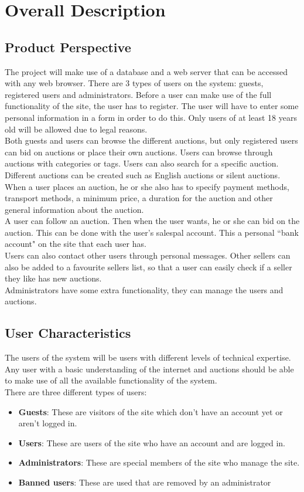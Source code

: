 \chapter{Overall Description}

\section{Product Perspective}
	The project will make use of a database and a web server that can be 
	accessed with any web browser. There are 3 types of users on the system:
	guests, registered users and administrators. Before a user can make use
	of the full functionality of the site, the user has to register. The user
	will have to enter some personal information in a form in order to do this.
	Only users of at least 18 years old will be allowed due to legal reasons.\\
	Both guests and users can browse the different auctions, but only registered 
	users can bid on auctions or place their own auctions. Users can browse through
	auctions with categories or tags. Users can also search for a  specific auction.\\
	Different auctions can be created such as English auctions\cite{English} or
	silent auctions\cite{silent}. When a user places an auction, he or she also has to specify
	payment methods, transport methods, a minimum price, a duration for the auction
	and other general information about the auction.\\
	A user can follow an auction. Then when the user wants, he or she can bid on the auction.
	This can be done with the user's salespal account. This a personal ``bank account" on
	the site that each user has. \\
	Users can also contact other users through personal messages. Other sellers can also
	be added to a favourite sellers list, so that a user can easily check if a 
	seller they like has new auctions. \\
	Administrators have some extra functionality, they can manage the users 
	and auctions.
\section{User Characteristics}
	The users of the system will be users with different levels of 
	technical expertise. Any user with a basic understanding of the 
	internet and auctions should be able to make use of all the 
	available functionality of the system.\\
	There are three different types of users:
	\begin{itemize}
		\item \textbf{Guests}: These are visitors of the site which don't 
		have an account yet or aren't logged in.
		\item \textbf{Users}: These are users of the site who have an 
		account and are logged in.
		\item \textbf{Administrators}: These are special members of the 
		site who manage the site.
		\item \textbf{Banned users}: These are used that are removed by
		an administrator
	\end{itemize}

